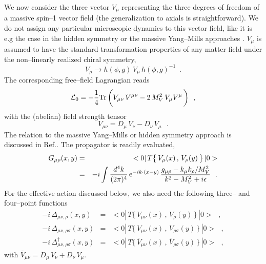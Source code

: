We now consider the three vector $V_\mu$ representing the three
degrees of freedom of a massive spin--1  vector field (the
generalization to axials is straightforward). We do not assign any
particular microscopic dynamics to this vector field, like it is e.g
the case in the hidden symmetry \cite{bky} or the massive Yang--Mills
approaches \cite{ulfpr}. $V_\mu$ is assumed to have the standard
transformation properties of any matter field under the non--linearly
realized chiral symmetry,
\begin{equation}
V_{\mu} \to h(\phi,g) \, V_{\mu} \, h(\phi,g)^{-1} \, \, \, .
\label{ccwzv}
\end{equation}
The corresponding free--field Lagrangian reads
\begin{equation}
{\cal L}_0 = - \frac{1}{4} {\rm Tr} \, \biggl( V_{\mu \nu} \,
V^{\mu \nu}  -  2 \,  M_V^2 \, V_{\mu} V^{\mu} \, \biggr)\, \, \, \, ,
\label{lvfree}
\end{equation}
with the (abelian) field strength tensor
\begin{equation}
V_{\mu \nu} = D_\mu \, V_\nu - D_\nu \, V_\mu
\, \, \, \, .
\label{defvmunu}
\end{equation}
The relation to the massive Yang--Mills or hidden symmetry approach is
discussed in Ref.\cite{reso1}. The propagator is readily evaluated,
\begin{eqnarray}
G_{\mu \rho} (x,y) &=& <0| \,T \bigl\{ \,V_\mu (x) \, , \,  V_\rho (y)
\, \bigr\} \, |0 > \nonumber \\
&=& -i  \int  \frac{d^4k}{(2\pi )^4} \, {\rm
  e}^{-i k\cdot (x-y)} \, \frac{g_{\mu \rho} - k_\mu k_\rho/M_V^2}{k^2
  - M_V^2 + i \epsilon} \, \, \, \, .
\label{propv}
\end{eqnarray}
For the effective action discussed below, we also need the following
three-- and four--point functions
\begin{eqnarray}
-i \, \Delta_{\mu \nu ,  \rho} (x,y) &=& <0| \,T \bigl\{ \,V_{\mu \nu}  (x)
\, , \,  V_\rho (y)
\, \bigr\} \, |0 > \, \, \, \, , \nonumber \\
-i \, \Delta_{\mu \nu ,  \rho \sigma} (x,y) &=&
<0| \,T \bigl\{ \,V_{\mu \nu}  (x)  \, , \,  V_{\rho \sigma} (y)
\, \bigr\} \, |0 > \, \, \, \, , \nonumber \\
-i \, \Delta_{\mu \nu ,  \rho \sigma}^\dagger (x,y) &=&
<0| \,T \bigl\{ \,\bar{V}_{\mu \nu}  (x)  \, , \,  \bar{V}_{\rho \sigma} (y)
\, \bigr\} \, |0 >  \, \, \, \, ,
\label{def34pt}
\end{eqnarray}
with $\bar{V}_{\mu \nu} = D_\mu \, V_\nu + D_\nu \, V_\mu$.
